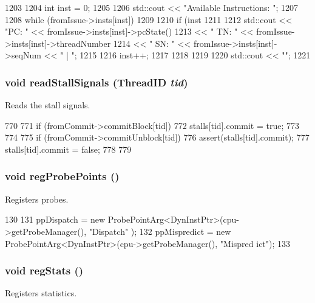 \begin{DoxyCode}
1203 {
1204     int inst = 0;
1205 
1206     std::cout << "Available Instructions: ";
1207 
1208     while (fromIssue->insts[inst]) {
1209 
1210         if (inst%
1211 
1212         std::cout << "PC: " << fromIssue->insts[inst]->pcState()
1213              << " TN: " << fromIssue->insts[inst]->threadNumber
1214              << " SN: " << fromIssue->insts[inst]->seqNum << " | ";
1215 
1216         inst++;
1217 
1218     }
1219 
1220     std::cout << "\n";
1221 }
\end{DoxyCode}
\hypertarget{classDefaultIEW_ad65c9f053a6038ac8c34c34bfe9a88c3}{
\subsubsection[{readStallSignals}]{\setlength{\rightskip}{0pt plus 5cm}void readStallSignals ({\bf ThreadID} {\em tid})}}
\label{classDefaultIEW_ad65c9f053a6038ac8c34c34bfe9a88c3}
Reads the stall signals. 


\begin{DoxyCode}
770 {
771     if (fromCommit->commitBlock[tid]) {
772         stalls[tid].commit = true;
773     }
774 
775     if (fromCommit->commitUnblock[tid]) {
776         assert(stalls[tid].commit);
777         stalls[tid].commit = false;
778     }
779 }
\end{DoxyCode}
\hypertarget{classDefaultIEW_aa2dab17a363fd4307274d579796adcf7}{
\subsubsection[{regProbePoints}]{\setlength{\rightskip}{0pt plus 5cm}void regProbePoints ()}}
\label{classDefaultIEW_aa2dab17a363fd4307274d579796adcf7}
Registers probes. 


\begin{DoxyCode}
130 {
131     ppDispatch = new ProbePointArg<DynInstPtr>(cpu->getProbeManager(), "Dispatch"
      );
132     ppMispredict = new ProbePointArg<DynInstPtr>(cpu->getProbeManager(), "Mispred
      ict");
133 }
\end{DoxyCode}
\hypertarget{classDefaultIEW_a4dc637449366fcdfc4e764cdf12d9b11}{
\subsubsection[{regStats}]{\setlength{\rightskip}{0pt plus 5cm}void regStats ()}}
\label{classDefaultIEW_a4dc637449366fcdfc4e764cdf12d9b11}
Registers statistics. 


